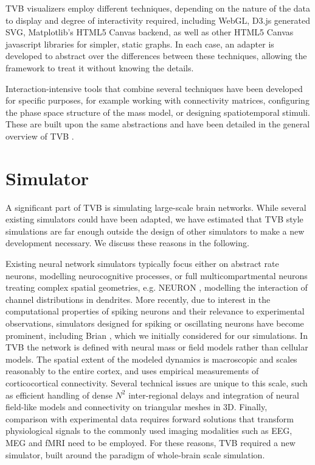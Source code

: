 \documentclass{bioinfo}
\begin{document}
TVB visualizers employ different techniques, depending on the nature of
the data to display and degree of interactivity required, including WebGL,
D3.js generated SVG, Matplotlib's HTML5 Canvas backend, as well as other
HTML5 Canvas javascript libraries for simpler, static graphs. In each case,
an adapter is developed to abstract over the differences between these
techniques, allowing the framework to treat it without knowing the details.

Interaction-intensive tools that combine several techniques have been developed
for specific purposes, for example working with connectivity matrices, 
configuring the phase space structure of the mass model, or designing
spatiotemporal stimuli. These are built upon the same abstractions and have been
detailed in the general overview of TVB \citep{Sanz-Leon_2013}.

\section{Simulator}

A significant part of TVB is simulating large-scale brain networks. While
several existing simulators could have been adapted, we have estimated that
TVB style simulations are far enough outside the design of other simulators to
make a new development necessary. We discuss these reasons in the following. 

Existing neural network simulators typically focus either on abstract rate neurons, 
modelling  neurocognitive processes, or 
full multicompartmental neurons treating complex spatial
geometries, e.g. NEURON \citep{Hines_2001}, modelling the interaction of 
channel distributions in dendrites.  More recently, due to interest in
the computational properties of spiking neurons and their relevance to
experimental observations, simulators designed for spiking or oscillating neurons
have become prominent, including Brian \citep{Goodman_2009}, which we initially 
considered for our simulations.
In TVB the network is defined with neural mass or field
models \citep{Deco_2008a, Coombes_2010} rather than cellular models. The
spatial extent of the modeled dynamics is macroscopic and scales reasonably 
to the entire cortex, and uses empirical measurements of corticocortical
connectivity. Several technical issues are unique to this scale, such
as efficient handling of dense $N^2$ inter-regional delays and integration
of neural field-like models and connectivity on triangular meshes in 3D.
Finally, comparison with experimental data requires forward solutions
that transform physiological signals to the commonly
used imaging modalities such as EEG, MEG and fMRI need to be employed.
For these reasons, TVB required a new simulator, built around the paradigm
of whole-brain scale simulation.
\end{document}
